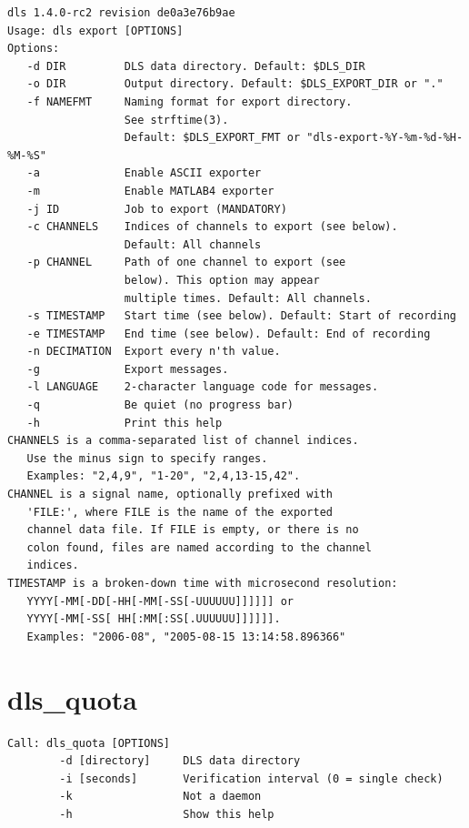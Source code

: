 \documentclass[a4paper,12pt,BCOR6mm,bibtotoc,idxtotoc]{scrbook}
\begin{document}
\begin{lstlisting}
dls 1.4.0-rc2 revision de0a3e76b9ae
Usage: dls export [OPTIONS]
Options:
   -d DIR         DLS data directory. Default: $DLS_DIR
   -o DIR         Output directory. Default: $DLS_EXPORT_DIR or "."
   -f NAMEFMT     Naming format for export directory.
                  See strftime(3).
                  Default: $DLS_EXPORT_FMT or "dls-export-%Y-%m-%d-%H-%M-%S"
   -a             Enable ASCII exporter
   -m             Enable MATLAB4 exporter
   -j ID          Job to export (MANDATORY)
   -c CHANNELS    Indices of channels to export (see below).
                  Default: All channels
   -p CHANNEL     Path of one channel to export (see
                  below). This option may appear
                  multiple times. Default: All channels.
   -s TIMESTAMP   Start time (see below). Default: Start of recording
   -e TIMESTAMP   End time (see below). Default: End of recording
   -n DECIMATION  Export every n'th value.
   -g             Export messages.
   -l LANGUAGE    2-character language code for messages.
   -q             Be quiet (no progress bar)
   -h             Print this help
CHANNELS is a comma-separated list of channel indices.
   Use the minus sign to specify ranges.
   Examples: "2,4,9", "1-20", "2,4,13-15,42".
CHANNEL is a signal name, optionally prefixed with
   'FILE:', where FILE is the name of the exported
   channel data file. If FILE is empty, or there is no
   colon found, files are named according to the channel
   indices.
TIMESTAMP is a broken-down time with microsecond resolution:
   YYYY[-MM[-DD[-HH[-MM[-SS[-UUUUUU]]]]]] or
   YYYY[-MM[-SS[ HH[:MM[:SS[.UUUUUU]]]]]].
   Examples: "2006-08", "2005-08-15 13:14:58.896366"
\end{lstlisting}


\section{dls\_quota}
\label{sec:apx_cmd_quota}

\begin{lstlisting}
Call: dls_quota [OPTIONS]
        -d [directory]     DLS data directory
        -i [seconds]       Verification interval (0 = single check)
        -k                 Not a daemon
        -h                 Show this help
\end{lstlisting}


\printindex
\end{document}
